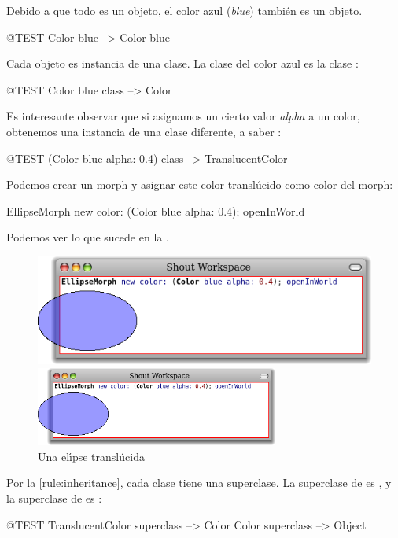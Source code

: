 \documentclass[a4paper,10pt,twoside]{book}
\begin{document}
Debido a que todo es un objeto, el color azul (\emph{blue}) tambi\'en es un objeto.
\begin{code}{@TEST}
Color blue --> Color blue
\end{code}

\noindent
Cada objeto es instancia de una clase. La clase del color azul es la clase  :
\begin{code}{@TEST}
Color blue class --> Color
\end{code}

\noindent
Es interesante observar que si asignamos un cierto valor \emph{alpha} a un color, obtenemos una instancia de una clase diferente, a saber : 
\begin{code}{@TEST}
(Color blue alpha: 0.4) class --> TranslucentColor
\end{code}

\noindent
Podemos crear un morph y asignar este color transl\'ucido como color del morph: 
\begin{code}{}
EllipseMorph new color: (Color blue alpha: 0.4); openInWorld
\end{code}
\noindent
Podemos ver lo que sucede en la  .

\begin{center}
\begin{figure}[!ht]
\ifluluelse
	{\centerline {\includegraphics[scale=0.7]{TranslucentEllipse}}}
	{\centerline {\includegraphics[width=8cm]{TranslucentEllipse}}}
\caption{Una el\'{\i}pse transl\'ucida}
\end{figure}
\end{center}

Por la \ref{rule:inheritance}, cada clase tiene una superclase.
La superclase de  es , y la superclase de  es :
\begin{code}{@TEST}
TranslucentColor superclass --> Color
Color superclass                   --> Object
\end{code}
\end{document}
